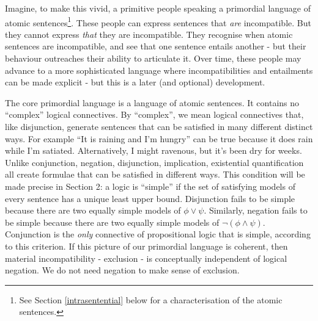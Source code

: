 Imagine, to make this vivid, a primitive people speaking a
primordial language of atomic sentences\footnote{See Section \ref{intrasentential} below for a characterisation of the atomic sentences.}. These people can express
sentences that \emph{are} incompatible.  But they cannot express
\emph{that} they are incompatible.  They
recognise when atomic sentences are incompatible, and see that one
sentence entails another - but their behaviour outreaches their ability
to articulate it.  Over time, these people may advance to a more
sophisticated language where incompatibilities and entailments can be
made explicit - but this is a later (and optional) development.

The core primordial language is a language of atomic sentences.
It contains no ``complex'' logical connectives.  By ``complex'', we mean logical
connectives that, like disjunction, generate sentences that can be
satisfied in many different distinct ways.
For example ``It is raining and I'm hungry'' can be true because it does rain while I'm satiated.
Alternatively, I might ravenous, but it's been dry for weeks.  Unlike conjunction, negation, disjunction,
implication, existential quantification all create formulae that can
be satisfied in different ways. This condition will be
made precise in Section 2: a logic is ``simple'' if the set of
satisfying models of every sentence has a unique least upper
bound. Disjunction fails to be simple because there are two equally
simple models of $\phi \lor \psi$. Similarly, negation fails to be simple
because there are two equally simple models of $\neg (\phi \land
\psi)$. Conjunction is the \emph{only} connective of propositional logic that is simple,
according to this criterion.
If this picture of our primordial language is coherent, then material incompatibility - exclusion - is conceptually independent of logical negation.
We do not need negation to make sense of exclusion.

